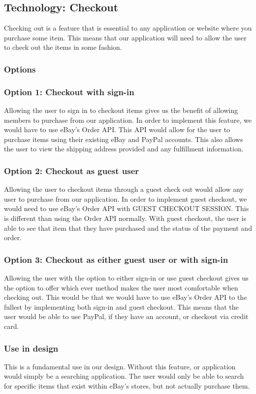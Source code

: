 \documentclass[journal,compsoc, 10pt, draftclsnofoot, onecolumn]{IEEEtran}
\begin{document}
\subsection{Technology: Checkout}
Checking out is a feature that is essential to any application or website where
you purchase some item. This means that our application will need to allow the
user to check out the items in some fashion.

\subsubsection{Options}
\subsubsection*{Option 1: Checkout with sign-in}
Allowing the user to sign in to checkout items gives us the benefit of allowing
members to purchase from our application. In order to implement this feature, we 
would have to use eBay's Order API. This API would allow for the user to
purchase items using their existing eBay and PayPal accounts. This also allows
the user to view the shipping address provided and any fulfillment information.

\subsubsection*{Option 2: Checkout as guest user}
Allowing the user to checkout items through a guest check out would allow any
user to purchase from our application. In order to implement guest checkout, we
would need to use eBay's Order API with GUEST CHECKOUT SESSION. This is
different than using the Order API normally. With guest checkout, the user is
able to see that item that they have purchased and the status of the payment and
 order.

\subsubsection*{Option 3: Checkout as either guest user or with sign-in}
Allowing the user with the option to either sign-in or use guest checkout gives
us the option to offer which ever method makes the user most comfortable when
checking out. This would be that we would have to use eBay's Order API to the
fullest by implementing both sign-in and guest checkout. This means that the
user would be able to use PayPal, if they have an account, or checkout via
credit card.

\subsubsection{Use in design}
This is a fundamental use in our design. Without this feature, or application
would simply be a searching application. The user would only be able to search
for specific items that exist within eBay's stores, but not actually purchase
them.
\end{document}
